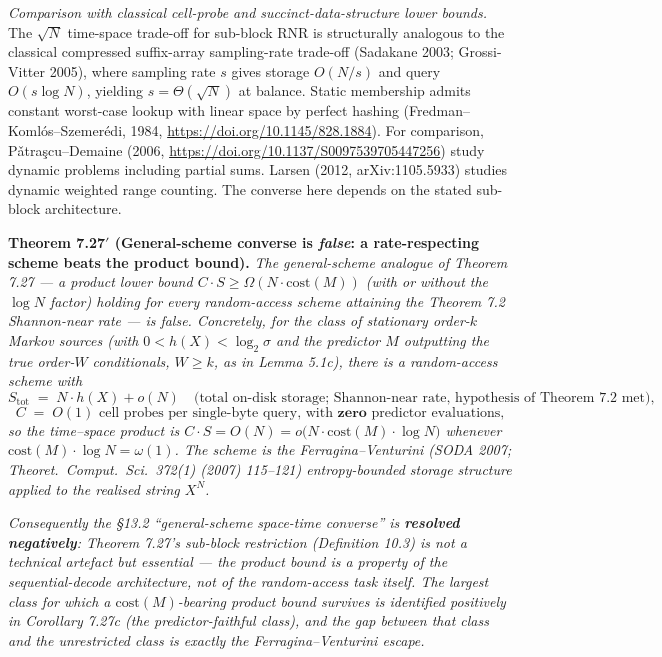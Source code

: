 \documentclass[
]{article}
\begin{document}
\emph{Comparison with classical cell-probe and succinct-data-structure
lower bounds.} The $\sqrt{N}$ time-space trade-off for sub-block
RNR is structurally analogous to the classical compressed
suffix-array sampling-rate trade-off (Sadakane 2003;
Grossi-Vitter 2005), where sampling rate $s$ gives storage $O(N/s)$
and query $O(s \log N)$, yielding $s = \Theta(\sqrt{N})$ at balance.
Static membership admits constant worst-case lookup with linear
space by perfect hashing (Fredman--Koml\'os--Szemer\'edi, 1984,
\url{https://doi.org/10.1145/828.1884}). For comparison, P\v{a}tra\c{s}cu--Demaine
(2006, \url{https://doi.org/10.1137/S0097539705447256}) study dynamic
problems including partial sums. Larsen (2012, arXiv:1105.5933)
studies dynamic weighted range counting. The converse here depends
on the stated sub-block architecture.

\textbf{Theorem 7.27$'$ (General-scheme converse is \emph{false}: a
rate-respecting scheme beats the product bound).} \emph{The
general-scheme analogue of Theorem 7.27 --- a product lower bound
$C \cdot S \geq \Omega(N \cdot \mathrm{cost}(M))$ (with or without the
$\log N$ factor) holding for every random-access scheme attaining the
Theorem 7.2 Shannon-near rate --- is false. Concretely, for the class of
stationary order-$k$ Markov sources (with $0 < h(X) < \log_2 \sigma$ and
the predictor $M$ outputting the true order-$W$ conditionals, $W \geq
k$, as in Lemma 5.1c), there is a random-access scheme with}
\[
  S_{\mathrm{tot}} \;=\; N \cdot h(X) + o(N) \quad\text{(total on-disk
  storage; Shannon-near rate, hypothesis of Theorem 7.2 met)},
\]
\[
  C \;=\; O(1) \text{ cell probes per single-byte query, with }
  \textbf{zero}\text{ predictor evaluations,}
\]
\emph{so the time--space product is $C \cdot S = O(N) = o\bigl(N \cdot
\mathrm{cost}(M) \cdot \log N\bigr)$ whenever $\mathrm{cost}(M) \cdot
\log N = \omega(1)$. The scheme is the Ferragina--Venturini (SODA 2007;
\emph{Theoret.\ Comput.\ Sci.}\ 372(1) (2007) 115--121) entropy-bounded
storage structure applied to the realised string $X^N$.}

\emph{Consequently the §13.2 ``general-scheme space-time converse'' is
\textbf{resolved negatively}: Theorem 7.27's sub-block restriction
(Definition 10.3) is not a technical artefact but \emph{essential} ---
the product bound is a property of the sequential-decode architecture,
not of the random-access task itself. The largest class for which a
$\mathrm{cost}(M)$-bearing product bound survives is identified
positively in Corollary 7.27c (the predictor-faithful class), and the
gap between that class and the unrestricted class is exactly the
Ferragina--Venturini escape.}
\end{document}
